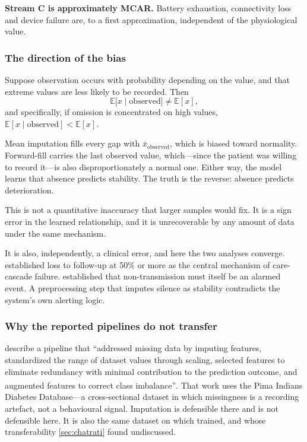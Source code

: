 \documentclass[12pt,a4paper,oneside]{report}
\newcommand{\bq}[1]{``#1''\textsuperscript{\dag}}
\begin{document}
\textbf{Stream C is approximately MCAR.} Battery exhaustion, connectivity loss and device failure are, to a first approximation, independent of the physiological value.

\subsubsection{The direction of the bias}\label{sec:bias-direction}

Suppose observation occurs with probability depending on the value, and that extreme values are less likely to be recorded. Then
\begin{equation}
  \mathbb{E}\bigl[x \mid \text{observed}\bigr] \neq \mathbb{E}[x],
\end{equation}
and specifically, if omission is concentrated on high values, $\mathbb{E}[x \mid \text{observed}] < \mathbb{E}[x]$.

Mean imputation fills every gap with $\bar{x}_{\text{observed}}$, which is biased toward normality. Forward-fill carries the last observed value, which---since the patient was willing to record it---is also disproportionately a normal one. Either way, the model learns that absence predicts stability. The truth is the reverse: absence predicts deterioration.

This is not a quantitative inaccuracy that larger samples would fix. It is a sign error in the learned relationship, and it is unrecoverable by any amount of data under the same mechanism.

It is also, independently, a clinical error, and here the two analyses converge.  established loss to follow-up at 50\% or more as the central mechanism of care-cascade failure.  established that non-transmission must itself be an alarmed event. A preprocessing step that imputes silence as stability contradicts the system's own alerting logic.

\subsubsection{Why the reported pipelines do not transfer}

\Textcite{liu2025review} describe a pipeline that \bq{addressed missing data by imputing features, standardized the range of dataset values through scaling, selected features to eliminate redundancy with minimal contribution to the prediction outcome, and augmented features to correct class imbalance}. That work uses the Pima Indians Diabetes Database---a cross-sectional dataset in which missingness is a recording artefact, not a behavioural signal. Imputation is defensible there and is not defensible here. It is also the same dataset on which \textcite{chatrati2022} trained, and whose transferability \cref{sec:chatrati} found undiscussed.
\end{document}
